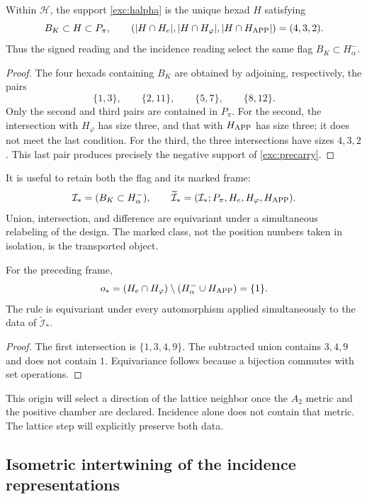 \begin{proposition}
\label{exc:selector-bandera}
Within $\mathcal H$, the support \eqref{exc:halpha} is the unique hexad
$H$ satisfying
\[
 B_K\subset H\subset P_\pi,
 \qquad
 (|H\cap H_e|,|H\cap H_\varphi|,|H\cap H_{\rm APP}|)=(4,3,2).
\]
Thus the signed reading and the incidence reading select the same
flag $B_K\subset H^-_\alpha$.
\end{proposition}

\begin{proof}
The four hexads containing $B_K$ are obtained by adjoining,
respectively, the pairs
\[
 \{1,3\},\qquad\{2,11\},\qquad\{5,7\},\qquad\{8,12\}.
\]
Only the second and third pairs are contained in $P_\pi$. For the
second, the intersection with $H_\varphi$ has size three, and that with
$H_{\rm APP}$ has size three; it does not meet the last condition. For the
third, the three intersections have sizes $4,3,2$. This last pair
produces precisely the negative support of \eqref{exc:precarry}.
\end{proof}

It is useful to retain both the flag and its marked frame:
\[
 \mathcal I_*=(B_K\subset H^-_\alpha),\qquad
 \widetilde{\mathcal I}_*
   =(\mathcal I_*;P_\pi,H_e,H_\varphi,H_{\rm APP}).
\]
Union, intersection, and difference are equivariant
under a simultaneous relabeling of the design. The marked class, not the
position numbers taken in isolation, is the transported object.

\begin{lemma}
\label{exc:origen}
For the preceding frame,
\[
 o_*=(H_e\cap H_\varphi)
           \setminus(H^-_\alpha\cup H_{\rm APP})=\{1\}.
\]
The rule is equivariant under every automorphism applied simultaneously
to the data of $\widetilde{\mathcal I}_*$.
\end{lemma}

\begin{proof}
The first intersection is $\{1,3,4,9\}$. The subtracted union
contains $3,4,9$ and does not contain $1$. Equivariance follows because a
bijection commutes with set operations.
\end{proof}

This origin will select a direction of the lattice neighbor once the
$A_2$ metric and the positive chamber are declared. Incidence alone
does not contain that metric. The lattice step will explicitly preserve
both data.

\subsection{Isometric intertwining of the incidence representations}
\label{exc:entrelazador}

